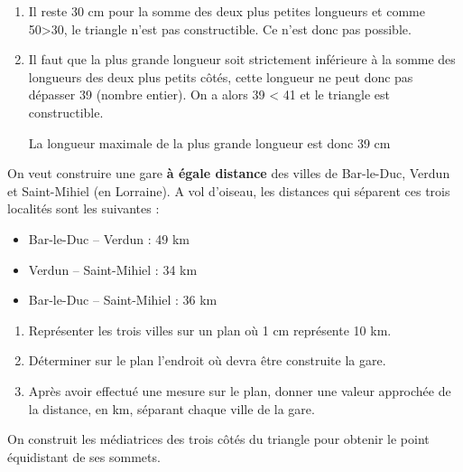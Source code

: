 \documentclass[a4paper]{book}
\begin{document}
{\begin{exercice}
        \begin{enumerate}
            \item Il reste 30 cm pour la somme des deux plus petites longueurs et comme 50>30, le triangle n'est pas constructible. Ce n'est donc pas possible.

            \item Il faut que la plus grande longueur soit strictement inférieure à la somme des longueurs des deux plus petits côtés, cette longueur ne peut donc pas dépasser 39 (nombre entier). On a alors 39 < 41 et le triangle est constructible.

            \medskip

            La longueur maximale de la plus grande longueur est donc 39 cm
        \end{enumerate}           

    \end{exercice}


    \begin{exercice}
        On veut construire une gare \textbf{à égale distance} des villes de Bar-le-Duc, Verdun et Saint-Mihiel (en Lorraine). A vol d’oiseau, les distances qui séparent ces trois localités sont les
        suivantes :
        \begin{itemize}
            \item Bar-le-Duc – Verdun : 49 km
            \item Verdun – Saint-Mihiel : 34 km
            \item Bar-le-Duc – Saint-Mihiel : 36 km
        \end{itemize}

        \begin{enumerate}
            \item Représenter les trois villes sur un plan où 1 cm représente 10 km.
            
            \item Déterminer sur le plan l’endroit où devra être construite la gare.

            \item Après avoir effectué une mesure sur le plan, donner une valeur approchée de la distance, en km, séparant chaque ville de la gare.
        \end{enumerate}
    \end{exercice}

    \begin{minipage}{0.45\linewidth}
        On construit les médiatrices des trois côtés du triangle pour obtenir le point équidistant de ses sommets.
        

\end{minipage}}
\end{document}
